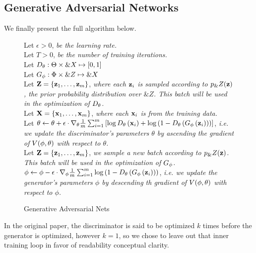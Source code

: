 \subsection{Generative Adversarial Networks}

We finally present the full algorithm below.

\begin{figure}[H] \centering
  \begin{minipage}{0.95\linewidth}
    \begin{algorithm}[H]
      Let $\epsilon > 0$, \textit{be the learning rate.} \\
      Let $T > 0$, \textit{be the number of training iterations.} \\
      Let $D_\theta: \Theta \times \&X \mapsto [0, 1]$ \\
      Let $G_\phi: \Phi \times \&Z \mapsto \&X$ \\
       {
        Let $\mathbf{Z} = \{\mathbf{z}_1, \dots, \mathbf{z}_m\}$,
        \textit{where each $\mathbf{z}_i$ is sampled according to $p_\&Z(\mathbf{z})$, the
          prior probability distribution over
          $\&Z$.  This batch will be used in the optimization of $D_\theta$.} \\
      Let $\mathbf{X} = \{\mathbf{x}_1, \dots, \mathbf{x}_m\}$, \textit{where each $\mathbf{x}_i$
is from the training data.} \\
      Let $\theta \gets \theta + \epsilon \cdot \nabla_{\theta} {1
\over m} \sum_{i=1}^m \left[ \log{D_\theta\left( \mathbf{x}_i\right)} +
\log{\left(1 - D_\theta\left(G_\phi\left( \mathbf{z}_i\right)\right)\right)} \right]$,
\textit{i.e.  we update the discriminator's parameters $\theta$ by
ascending the gradient of $V(\phi, \theta)$ with respect to $\theta$.} \\
      Let $\mathbf{Z} = \{\mathbf{z}_1, \dots, \mathbf{z}_m\}$, \textit{we sample a new
batch according to $p_\&Z(\mathbf{z})$. This batch will be used in the optimization
of $G_\phi$.} \\

$\phi \gets \phi - \epsilon \cdot \nabla_{\phi} {1 \over m }
\sum_{i=1}^m \log{\left(1 -
    D_\theta\left(G_\phi\left(\mathbf{z}_i\right)\right)\right)}$, \textit{i.e.  we
  update the generator's parameters $\phi$ by descending th gradient
  of $V(\phi, \theta)$ with respect to $\phi$.} \\ }
    \caption{Generative Adversarial Nets}
    \label{algo:main-algo}
  \end{algorithm}
  \end{minipage}
\end{figure}

In the original paper, the discriminator is said to be optimized $k$
times before the generator is optimized, however $k=1$, so we chose to
leave out that inner training loop in favor of readability conceptual
clarity.

